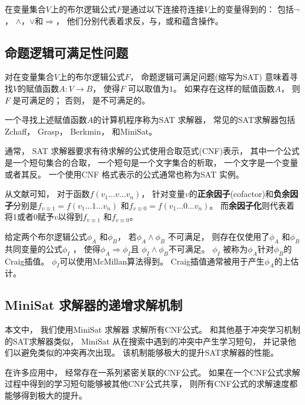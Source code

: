 在变量集合$V$上的布尔逻辑公式$F$是通过以下连接符连接$V$上的变量得到的：
包括$\neg$， $\wedge$，$\vee$和$\Rightarrow$，
他们分别代表着求反，与，或和蕴含操作。

\subsection{命题逻辑可满足性问题}

对在变量集合$V$上的布尔逻辑公式$F$，
命题逻辑可满足问题(缩写为SAT)
意味着寻找$V$的赋值函数$A:V\to B$，
使得$F$ 可以取值为$1$。
如果存在这样的赋值函数$A$，
则$F$ 是可满足的；
否则，
是不可满足的。

一个寻找上述赋值函数$A$的计算机程序称为SAT 求解器，
常见的SAT求解器包括Zchaff，
Grasp，
Berkmin，
和MiniSat。


通常，
SAT 求解器要求有待求解的公式使用合取范式(CNF)表示，
其中一个公式是一个短句集合的合取，
一个短句是一个文字集合的析取，
一个文字是一个变量或者其反。
一个使用CNF 格式表示的公式通常也称为SAT 实例。


从文献可知，
对于函数$f(v_1\dots v\dots v_n)$，
针对变量$v$的\textbf{正余因子}(cofactor)和\textbf{负余因子}分别是$f_{v\equiv 1}=f(v_1\dots 1\dots v_n)$ 和$f_{v\equiv 0}=f(v_1\dots 0\dots v_n)$。
而\textbf{余因子化}则代表着将1或者0赋予$v$以得到$f_{v\equiv 1}$ 和$f_{v\equiv 0}$。

给定两个布尔逻辑公式$\phi_A$ 和$\phi_B$，
若$\phi_A\wedge \phi_B$ 不可满足，
则存在仅使用了$\phi_A$ 和$\phi_B$共同变量的公式$\phi_I$ ，
 使得$\phi_A\Rightarrow \phi_I$且
$\phi_I\wedge \phi_B$不可满足。
$\phi_I$ 被称为$\phi_A$针对$\phi_B$的Craig插值。
$\phi_I$可以使用McMillan算法得到。
Craig插值通常被用于产生$\phi_A$的上估计。


\subsection{MiniSat 求解器的递增求解机制}\label{subsec_incsat}

本文中，
我们使用MiniSat 求解器 求解所有CNF公式。
和其他基于冲突学习机制的SAT求解器类似，
MiniSat 从在搜索中遇到的冲突中产生学习短句，
并记录他们以避免类似的冲突再次出现。
该机制能够极大的提升SAT求解器的性能。

在许多应用中，
经常存在一系列紧密关联的CNF公式。
如果在一个CNF公式求解过程中得到的学习短句能够被其他CNF公式共享，
则所有CNF公式的求解速度都能够得到极大的提升。

